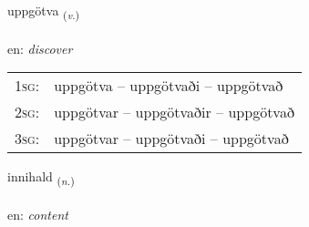 \documentclass[frontgrid, backgrid]{flacards}\usepackage[]{graphicx}\usepackage[]{xcolor}
\begin{document}
\renewcommand{\flhead}{\vskip5pt \fboxsep=0pt {\small\bfseries\footnotesize Sagnorð | Verb}}
\renewcommand{\fcfoot}{\vskip5pt \fboxsep=0pt \hspace{2pt}{\small\bfseries\footnotesize 3K}}

\renewcommand{\blhead}{\vskip5pt {\small\bfseries\footnotesize Sagnorð | Verb }}
\renewcommand{\bcfoot}{\vskip5pt \hspace{2pt}{\small\bfseries\footnotesize 3K}}


{uppgötva \small{\textsubscript{(\textit{v.})}} \\[1ex] %
\textphonetic{[ʏhpkœtva]} \\
en: \emph{discover} \\  [2ex]
\renewcommand*{\arraystretch}{0.8}
\begin{tabular}{p{1cm}l}
\textsc{1sg}: & uppgötva -- uppgötvaði -- uppgötvað \\ 
\textsc{2sg}: & uppgötvar -- uppgötvaðir -- uppgötvað \\ 
\textsc{3sg}: & uppgötvar -- uppgötvaði -- uppgötvað \\ 
\end{tabular}
}

\renewcommand{\flhead}{\vskip5pt \fboxsep=0pt {\small\bfseries\footnotesize Nafnorð | Noun}}
\renewcommand{\fcfoot}{\vskip5pt \fboxsep=0pt \hspace{2pt}{\small\bfseries\footnotesize 3K}}

\renewcommand{\blhead}{\vskip5pt {\small\bfseries\footnotesize Nafnorð | Noun }}
\renewcommand{\bcfoot}{\vskip5pt \hspace{2pt}{\small\bfseries\footnotesize 3K}}


{innihald \small{\textsubscript{(\textit{n.})}} \\[1ex] %
\textphonetic{[ɪnɪhalt]} \\
en: \emph{content} \\  [2ex]
\renewcommand*{\arraystretch}{0.8}
}
\end{document}
